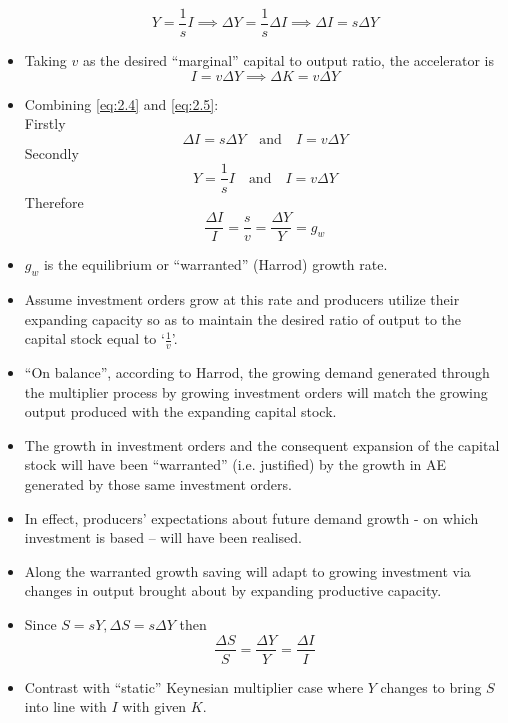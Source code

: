 \documentclass{article}
\begin{document}
\begin{itemize}
		\begin{equation}
			Y = \frac{1}{s} I \implies \Delta Y = \frac{1}{s} \Delta I \implies \Delta I = s \Delta Y \label{eq:2.4}
		\end{equation}
		\item Taking \( v \) as the desired ``marginal'' capital to output ratio, the accelerator is
		\begin{equation}
			I = v \Delta Y \implies \Delta K = v \Delta Y \label{eq:2.5}
		\end{equation}
		\item Combining \cref{eq:2.4} and \ref{eq:2.5}:\\
		Firstly
		\[
			\Delta I = s \Delta Y \quad\text{and}\quad I = v \Delta Y
		\]
		Secondly
		\[
			Y = \frac{1}{s} I \quad\text{and}\quad I = v \Delta Y
		\]
		Therefore
		\begin{equation}
			\frac{\Delta I}{I} = \frac{s}{v} = \frac{\Delta Y}{Y} = g_w \label{eq:2.6}
		\end{equation}
		\item \( g_w \) is the equilibrium or ``warranted'' (Harrod) growth rate.
		\item Assume investment orders grow at this rate and producers utilize their expanding capacity so as to maintain the desired ratio of output to the capital stock equal to `\( \frac{1}{v} \)'. 
		\item ``On balance'', according to Harrod, the growing demand generated through the multiplier process by growing investment orders will match the growing output produced with the expanding capital stock.
		\item The growth in investment orders  and the consequent expansion of the capital stock will have been ``warranted'' (i.e. justified) by the growth in AE generated by those same investment orders. 
		\item In effect, producers' expectations about future demand growth - on which investment is based -- will have been realised.
		\item Along the warranted growth saving will adapt to growing investment via changes in output brought about by expanding productive capacity.
		\item Since \( S = sY, \Delta S = s \Delta Y \) then
		\begin{equation}
			\frac{\Delta S}{S} = \frac{\Delta Y}{Y} = \frac{\Delta I}{I} \label{eq:2.7}
		\end{equation}
		\item Contrast with ``static'' Keynesian multiplier case where \( Y \) changes to bring \( S \) into line with \( I \) with given \( K \).

\end{itemize}
\end{document}
